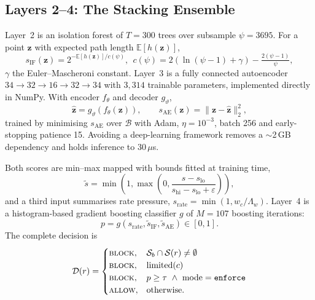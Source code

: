\documentclass[conference]{IEEEtran}
\begin{document}
\subsection{Layers 2--4: The Stacking Ensemble}
Layer~2 is an isolation forest of $T=300$ trees over subsample $\psi=3695$. For a point
$\mathbf{z}$ with expected path length $\mathbb{E}[h(\mathbf{z})]$,
\begin{equation}
s_{\text{IF}}(\mathbf{z})=2^{-\mathbb{E}[h(\mathbf{z})]/c(\psi)},\ \
c(\psi)=2\!\left(\ln(\psi{-}1)+\gamma\right)-\tfrac{2(\psi-1)}{\psi},
\label{eq:iforest}
\end{equation}
$\gamma$ the Euler--Mascheroni constant. Layer~3 is a fully connected autoencoder
$34\!\rightarrow\!32\!\rightarrow\!16\!\rightarrow\!32\!\rightarrow\!34$ with $3{,}314$
trainable parameters, implemented directly in NumPy. With encoder $f_{\theta}$ and decoder
$g_{\vartheta}$,
\begin{equation}
\hat{\mathbf{z}}=g_{\vartheta}(f_{\theta}(\mathbf{z})),\qquad
s_{\text{AE}}(\mathbf{z})=\lVert\mathbf{z}-\hat{\mathbf{z}}\rVert_{2}^{2},
\label{eq:ae}
\end{equation}
trained by minimising $s_{\text{AE}}$ over $\mathcal{B}$ with Adam, $\eta=10^{-3}$, batch
256 and early-stopping patience 15. Avoiding a deep-learning framework removes a
$\sim$2\,GB dependency and holds inference to 30\,$\mu$s.

Both scores are min--max mapped with bounds fitted at training time,
\begin{equation}
\tilde{s}=\min\!\left(1,\max\!\left(0,
\frac{s-s_{\text{lo}}}{s_{\text{hi}}-s_{\text{lo}}+\varepsilon}\right)\right),
\label{eq:norm}
\end{equation}
and a third input summarises rate pressure, $s_{\text{rate}}=\min(1,w_c/\Lambda_w)$. Layer~4
is a histogram-based gradient boosting classifier $g$ of $M=107$ boosting iterations:
\begin{equation}
p=g\!\left(s_{\text{rate}},\tilde{s}_{\text{IF}},\tilde{s}_{\text{AE}}\right)\in[0,1].
\label{eq:meta}
\end{equation}
The complete decision is
\begin{equation}
\mathcal{D}(r)=
\begin{cases}
\textsc{block}, & \mathcal{S}_b\cap\mathcal{S}(r)\neq\emptyset\\
\textsc{block}, & \text{limited}(c)\\
\textsc{block}, & p\ge\tau\ \wedge\ \text{mode}=\texttt{enforce}\\
\textsc{allow}, & \text{otherwise.}
\end{cases}
\label{eq:decision}
\end{equation}
\end{document}
